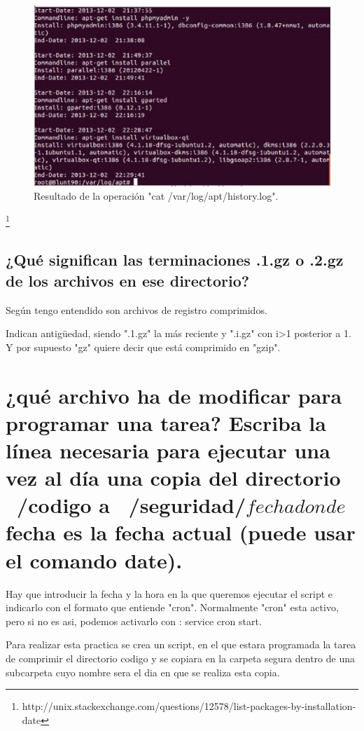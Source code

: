 \begin{figure}[H]
\begin{center}
\includegraphics[scale=0.6]{imagenes/ejercicio1.eps}
\caption{Resultado de la operación "cat /var/log/apt/history.log".}
\end{center}
\end{figure}

\footnote{http://unix.stackexchange.com/questions/12578/list-packages-by-installation-date}

\subsection{¿Qué significan las terminaciones .1.gz o .2.gz de los archivos en ese directorio?}
Según tengo entendido son archivos de registro comprimidos.

Indican antigüedad, siendo ".1.gz" la más reciente y ".i.gz" con i>1 posterior a 1.
Y por supuesto "gz" quiere decir que está comprimido en "gzip".

\section{¿qué archivo ha de modificar para programar una tarea? Escriba la línea necesaria para ejecutar una vez al día una copia del directorio ~/codigo a ~/seguridad/$fecha donde $fecha es la fecha actual (puede usar el comando date).}

Hay que introducir la fecha y la hora en la que queremos ejecutar el script e indicarlo con el formato que entiende "cron".
Normalmente "cron" esta activo, pero si no es asi, podemos activarlo con : service cron start.

Para realizar esta practica se crea un script, en el que estara programada la tarea de comprimir el directorio codigo y se copiara en la carpeta segura dentro de una subcarpeta cuyo nombre sera el dia en que se realiza esta copia.

